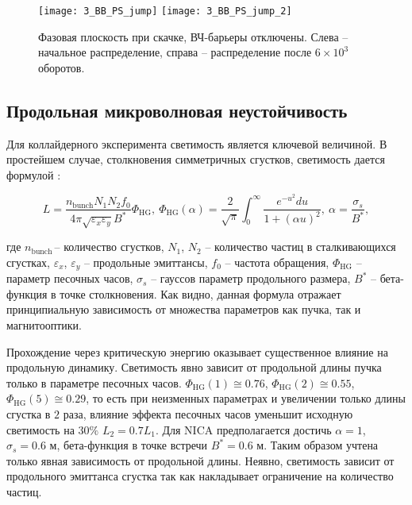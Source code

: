 \begin{figure}[!h]
   \texttt{[image: 3\_BB\_PS\_jump]}
   \texttt{[image: 3\_BB\_PS\_jump\_2]}
   \caption{Фазовая плоскость при скачке, ВЧ-барьеры отключены. Слева – начальное распределение, справа – распределение после $6\times{10}^3$ оборотов.}
   \label{fig:BB_PS_jump}
\end{figure}

\subsection{Продольная микроволновая неустойчивость}\label{sec:transition_jump/microwave_instab}

\par Для коллайдерного эксперимента светимость является ключевой величиной. В простейшем случае, столкновения симметричных сгустков, светимость дается формулой \cite{meshkov:luminocity}:

\begin{equation}
L=\frac{n_{\mathrm{bunch}}N_1N_2f_0}{4\pi\sqrt{\varepsilon_x\varepsilon_y}B^\ast}\Phi_{\textrm{HG}}, \
\Phi_{\textrm{HG}}(\alpha)=\frac{2}{\sqrt\pi}\int_{0}^{\infty}\frac{e^{-u^2}du}{1+(\alpha u)^2},\
\alpha=\frac{\sigma_s}{B^\ast},
\label{eq:luminocity}
\end{equation}

\noindent где $n_{\mathrm{bunch\ }}$– количество сгустков, $N_1$, $N_2$ – количество частиц в сталкивающихся сгустках, $\varepsilon_x$, $\varepsilon_y$ – продольные эмиттансы, $f_0$ – частота обращения, $\Phi_{\textrm{HG}}$ – параметр песочных часов, $\sigma_s$ – гауссов параметр продольного размера, $B^\ast$ – бета-функция в точке столкновения. Как видно, данная формула отражает принципиальную зависимость от множества параметров как пучка, так и магнитооптики.

\par Прохождение через критическую энергию оказывает существенное влияние на продольную динамику. Светимость явно зависит от продольной длины пучка только в параметре песочных часов. $\Phi_{\textrm{HG}}(1)\cong0.76$, $\Phi_{\textrm{HG}}(2)\cong0.55$, $\Phi_{\textrm{HG}}(5)\cong0.29$, то есть при неизменных параметрах и увеличении только длины сгустка в $2$ раза, влияние эффекта песочных часов уменьшит исходную светимость на $30\%$ $L_2=0.7L_1$. Для NICA предполагается достичь $\alpha=1$, $\sigma_s=0.6$ м, бета-функция в точке встречи $B^\ast=0.6$ м. Таким образом учтена только явная зависимость от продольной длины. Неявно, светимость зависит от продольного эмиттанса сгустка так как накладывает ограничение на количество частиц.

